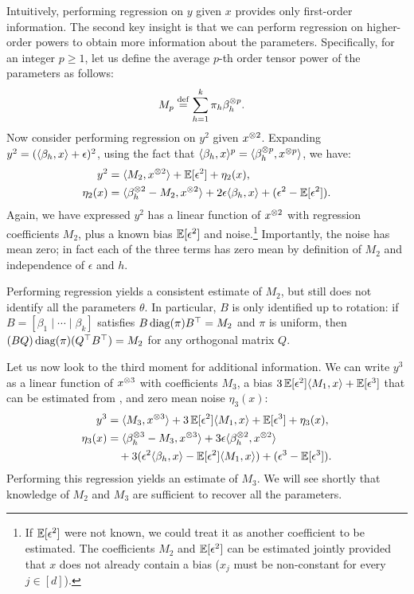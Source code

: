 Intuitively, performing regression on $y$ given $x$ provides only first-order
information.  The second key insight is that we can perform regression
on higher-order powers to obtain more information about the parameters.
Specifically, for an integer $p \ge 1$, let us define the average
$p$-th order tensor power of the parameters as follows:
\begin{align}
M_p &\eqdef \sum_{h=1}^k \pi_h \beta_h\tp{p}. \label{eqn:Mp} %
\end{align}
Now consider performing regression on $y^2$ given $x^{\otimes 2}$.
Expanding $y^2 = (\langle \beta_h, x \rangle + \epsilon)^2$,
using the fact that $\langle \beta_h, x \rangle^p = \langle \beta_h^{\otimes p}, x^{\otimes p} \rangle$,
we have:
\begin{align}
  y^2 &= \langle M_2, x^{\otimes 2} \rangle + \operatorname{\mathbb{E}}[\epsilon^2] + \eta_2(x), \label{eqn:y2} \\
\eta_2(x) &= \langle \beta_h^{\otimes 2} - M_2, x^{\otimes 2} \rangle + 2 \epsilon \langle \beta_h, x \rangle + (\epsilon^2 - \operatorname{\mathbb{E}}[\epsilon^2]). \nonumber
\end{align}
Again, we have expressed $y^2$ has a linear function of $x^{\otimes 2}$
with regression coefficients $M_2$, plus a known bias $\operatorname{\mathbb{E}}[\epsilon^2]$ and noise.\footnote{If $\operatorname{\mathbb{E}}[\epsilon^2]$ were not known,
we could treat it as another coefficient
to be estimated.  The coefficients $M_2$ and $\operatorname{\mathbb{E}}[\epsilon^2]$ can be estimated jointly
provided that $x$ does not already contain a bias ($x_j$ must be non-constant for every $j \in [d]$).}
Importantly, the noise has mean zero; 
in fact each of the three terms has zero mean
by definition of $M_2$ and independence of $\epsilon$ and $h$.

Performing regression yields a consistent estimate of $M_2$,
but still does not identify all the parameters $\theta$.
In particular, $B$ is only identified up to rotation:
if $B = [\beta_1 \mid \cdots \mid \beta_k]$ satisfies
$B \operatorname{diag}(\pi) B^\top = M_2$ and $\pi$ is uniform, then $(B Q) \operatorname{diag}(\pi) (Q^\top B^\top) = M_2$
for any orthogonal matrix $Q$.

Let us now look to the third moment for additional information.
We can write $y^3$ as a linear function of $x^{\otimes 3}$ with coefficients $M_3$,
a bias $3 \operatorname{\mathbb{E}}[\epsilon^2] \langle M_1, x \rangle + \operatorname{\mathbb{E}}[\epsilon^3]$ that can be estimated from , and zero mean noise $\eta_3(x)$:
\begin{align}
  y^3 &= \langle M_3, x^{\otimes 3} \rangle + 3\operatorname{\mathbb{E}}[\epsilon^2] \langle M_1, x \rangle + \operatorname{\mathbb{E}}[\epsilon^3] + \eta_3(x), \nonumber \\
\eta_3(x) &= \langle \beta_h^{\otimes 3} - M_3, x^{\otimes 3} \rangle
+ 3 \epsilon \langle \beta_h^{\otimes 2}, x^{\otimes 2} \rangle \label{eqn:y3} \\
&\quad + 3(\epsilon^2 \langle \beta_h, x \rangle - \operatorname{\mathbb{E}}[\epsilon^2] \langle M_1, x \rangle)
+ (\epsilon^3 - \operatorname{\mathbb{E}}[\epsilon^3]). \nonumber
\end{align}
Performing this regression yields an estimate of $M_3$.
We will see shortly that knowledge of $M_2$ and $M_3$ are sufficient to recover
all the parameters.

